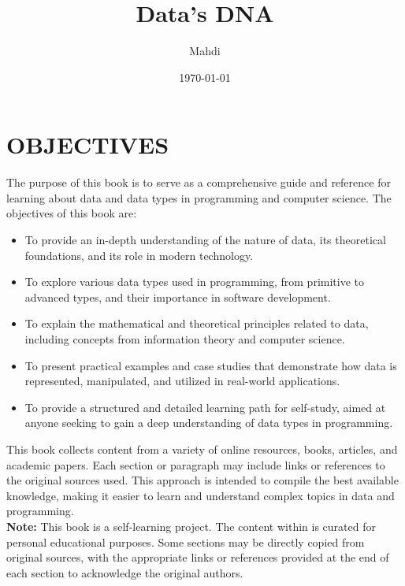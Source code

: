 \documentclass[12pt, oneside]{book}
\title{{\Huge Data's DNA}}
\author{{\LARGE Mahdi}}
\date{{\large \today}}
\begin{document}
	\frontmatter
	\mainmatter
	\maketitle
	\tableofcontents
\chapter{OBJECTIVES}

The purpose of this book is to serve as a comprehensive guide and reference for learning about data and data types in programming and computer science. The objectives of this book are:

\begin{itemize}
	\item To provide an in-depth understanding of the nature of data, its theoretical foundations, and its role in modern technology.
	\item To explore various data types used in programming, from primitive to advanced types, and their importance in software development.
	\item To explain the mathematical and theoretical principles related to data, including concepts from information theory and computer science.
	\item To present practical examples and case studies that demonstrate how data is represented, manipulated, and utilized in real-world applications.
	\item To provide a structured and detailed learning path for self-study, aimed at anyone seeking to gain a deep understanding of data types in programming.
\end{itemize}
This book collects content from a variety of online resources, books, articles, and academic papers. Each section or paragraph may include links or references to the original sources used. This approach is intended to compile the best available knowledge, making it easier to learn and understand complex topics in data and programming.\vspace{0.5cm}\\
\textbf{Note:} This book is a self-learning project. The content within is curated for personal educational purposes. Some sections may be directly copied from original sources, with the appropriate links or references provided at the end of each section to acknowledge the original authors.
\end{document}
